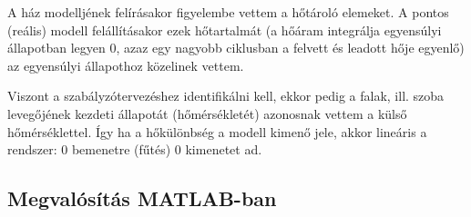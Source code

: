 A ház modelljének felírásakor figyelembe vettem a hőtároló elemeket. A pontos (reális) modell felállításakor ezek hőtartalmát (a hőáram integrálja egyensúlyi állapotban legyen 0, azaz egy nagyobb ciklusban a felvett és leadott hője egyenlő) az egyensúlyi állapothoz közelinek vettem.

Viszont a szabályzótervezéshez identifikálni kell, ekkor pedig a falak, ill. szoba levegőjének kezdeti állapotát (hőmérsékletét) azonosnak vettem a külső hőmérséklettel. Így ha a hőkülönbség a modell kimenő jele, akkor lineáris a rendszer: 0 bemenetre (fűtés) 0 kimenetet ad.

\subsection{Megvalósítás MATLAB-ban}




\pagebreak